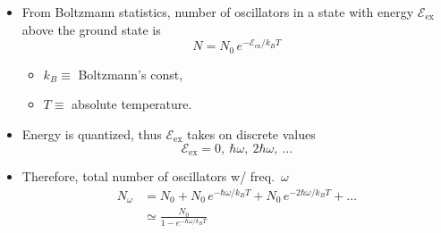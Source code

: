 \documentclass[11pt, oneside]{article}
\begin{document}
\begin{itemize}
	\item From Boltzmann statistics, number of oscillators in a state with energy $\mathcal{E}_\mathrm{ex}$ above the ground state is
	\begin{equation}
		\label{e:Boltz}
		N = N_0\,e^{-\mathcal{E}_\mathrm{ex}/k_BT}
	\end{equation}
	\begin{itemize}
		\item[] $k_B \equiv$ Boltzmann's const,
		\item[] $T \equiv$ absolute temperature.
	\end{itemize}
	\item Energy is quantized, thus $\mathcal{E}_\mathrm{ex}$ takes on discrete values
	\begin{equation*}
		\mathcal{E}_\mathrm{ex} = 0,\ \hbar\omega,\ 2\hbar\omega,\ \ldots
	\end{equation*}
	\item Therefore, total number of oscillators w/ freq.\ $\omega$
	\begin{align}
		N_\omega &= N_0 + N_0\,e^{-\hbar\omega/k_BT} + N_0\,e^{-2\hbar\omega/k_BT} + \ldots \nonumber\\
		&\simeq \frac{N_0}{1 - e^{-\hbar\omega/k_BT}} \label{e:Nw}
	\end{align}

\end{itemize}
\end{document}
